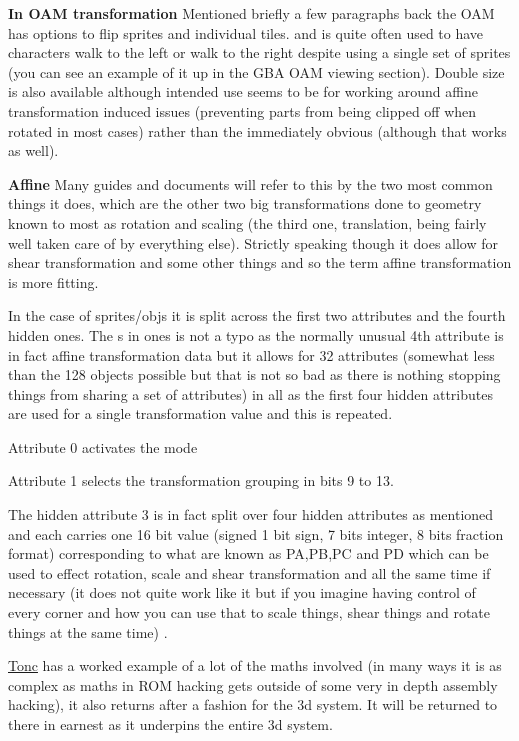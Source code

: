 \documentclass[
]{book}
\begin{document}
\textbf{In OAM transformation} Mentioned briefly a few paragraphs back the OAM has options to flip sprites and individual tiles. and is quite often used to have characters walk to the left or walk to the right despite using a single set of sprites (you can see an example of it up in the GBA OAM viewing section). Double size is also available although intended use seems to be for working around affine transformation induced issues (preventing parts from being clipped off when rotated in most cases) rather than the immediately obvious (although that works as well).

\textbf{Affine} Many guides and documents will refer to this by the two most common things it does, which are the other two big transformations done to geometry known to most as rotation and scaling (the third one, translation, being fairly well taken care of by everything else). Strictly speaking though it does allow for shear transformation and some other things and so the term affine transformation is more fitting.

In the case of sprites/objs it is split across the first two attributes and the fourth hidden ones. The s in ones is not a typo as the normally unusual 4th attribute is in fact affine transformation data but it allows for 32 attributes (somewhat less than the 128 objects possible but that is not so bad as there is nothing stopping things from sharing a set of attributes) in all as the first four hidden attributes are used for a single transformation value and this is repeated.

Attribute 0 activates the mode

Attribute 1 selects the transformation grouping in bits 9 to 13.

The hidden attribute 3 is in fact split over four hidden attributes as mentioned and each carries one 16 bit value (signed 1 bit sign, 7 bits integer, 8 bits fraction format) corresponding to what are known as PA,PB,PC and PD which can be used to effect rotation, scale and shear transformation and all the same time if necessary (it does not quite work like it but if you imagine having control of every corner and how you can use that to scale things, shear things and rotate things at the same time) .

\href{http://www.coranac.com/tonc/text/affine.htm}{Tonc} has a worked example of a lot of the maths involved (in many ways it is as complex as maths in ROM hacking gets outside of some very in depth assembly hacking), it also returns after a fashion for the 3d system. It will be returned to there in earnest as it underpins the entire 3d system.
\end{document}

